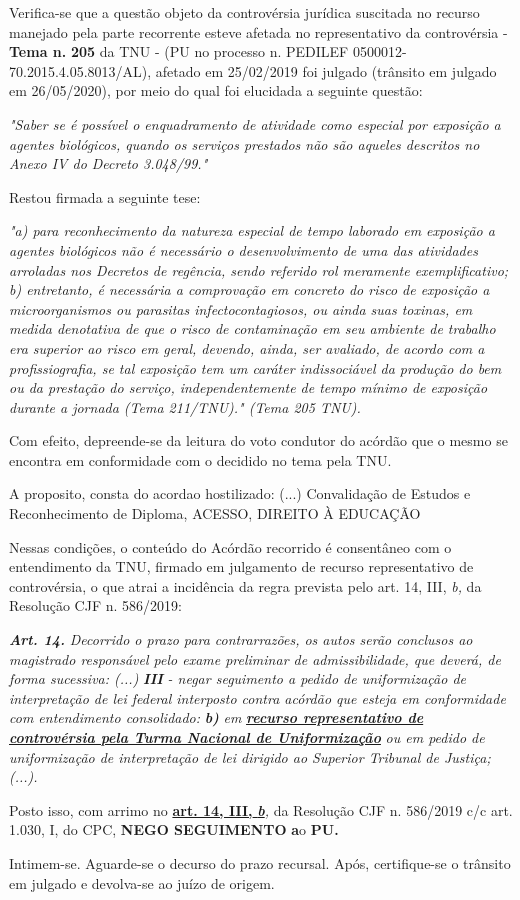 \documentclass[12pt]{article}
\begin{document}
\justifying
\noindent Verifica-se que a questão objeto da controvérsia jurídica suscitada no recurso manejado pela parte recorrente esteve afetada no representativo da controvérsia - \textbf{Tema n. }\textbf{205} da TNU - (PU no processo n. PEDILEF 0500012-70.2015.4.05.8013/AL),  afetado em 25/02/2019 foi julgado (trânsito em julgado em 26/05/2020), por meio do qual foi elucidada a seguinte questão:

\noindent \textit{"Saber se é possível o enquadramento de atividade como especial por exposição a agentes biológicos, quando os serviços prestados não são aqueles descritos no Anexo IV do Decreto 3.048/99."}

\noindent Restou firmada a seguinte tese:

\noindent \textit{"a) para reconhecimento da natureza especial de tempo laborado em exposição a agentes biológicos não é necessário o desenvolvimento de uma das atividades arroladas nos Decretos de regência, sendo referido rol meramente exemplificativo; b) entretanto, é necessária a comprovação em concreto do risco de exposição a microorganismos ou parasitas infectocontagiosos, ou ainda suas toxinas, em medida denotativa de que o risco de contaminação em seu ambiente de trabalho era superior ao risco em geral, devendo, ainda, ser avaliado, de acordo com a profissiografia, se tal exposição tem um caráter indissociável da produção do bem ou da prestação do serviço, independentemente de tempo mínimo de exposição durante a jornada (Tema 211/TNU)." (Tema 205 TNU).}

\noindent Com efeito, depreende-se da leitura do voto condutor do acórdão que o mesmo se encontra em conformidade com o decidido no  tema pela TNU.

\noindent A proposito, consta do acordao hostilizado: (...) Convalidação de Estudos e Reconhecimento de Diploma, ACESSO, DIREITO À EDUCAÇÃO

\noindent Nessas condições, o conteúdo do Acórdão recorrido é consentâneo com o entendimento da TNU, firmado em julgamento de recurso representativo de controvérsia, o que atrai a incidência da regra prevista pelo art. 14, III, \textit{b,} da Resolução CJF n. 586/2019:

\noindent \textit{\textbf{Art. 14.}}\textit{ Decorrido o prazo para contrarrazões, os autos serão conclusos ao magistrado responsável pelo exame preliminar de admissibilidade, que deverá, de forma sucessiva: (...) }\textit{\textbf{III }}\textit{- negar seguimento a pedido de uniformização de interpretação de lei federal interposto contra acórdão que esteja em conformidade com entendimento consolidado: }\textit{\textbf{b)}}\textit{ em }\uline{\textit{\textbf{recurso representativo de controvérsia pela Turma Nacional de Uniformização}}}\textit{ ou em pedido de uniformização de interpretação de lei dirigido ao Superior Tribunal de Justiça;(...).}

\noindent Posto isso, com arrimo no \uline{\textbf{art. 14, III, }}\uline{\textit{\textbf{b}}}\textit{,} da Resolução CJF n. 586/2019 c/c art. 1.030, I, do CPC, \textbf{NEGO SEGUIMENTO }\textbf{a}o\textbf{ PU}\textbf{.}

\noindent Intimem-se. Aguarde-se o decurso do prazo recursal. Após, certifique-se o trânsito em julgado e devolva-se ao juízo de origem.
\end{document}
